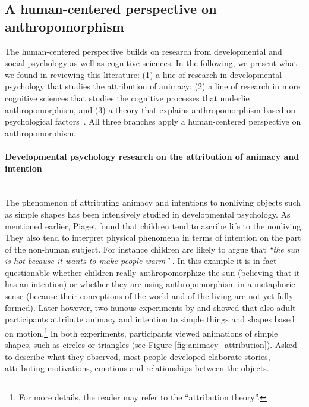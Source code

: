\documentclass{frontiersSCNS} %
\begin{document}
%
%
%
%
%
%

\subsection{A human-centered perspective on anthropomorphism}

The human-centered perspective builds on research from developmental and social psychology as well as cognitive sciences.  In the following, we present what we found in reviewing this literature: (1) a line of research in developmental psychology that studies the attribution of animacy; (2) a line of research in more cognitive sciences that studies the cognitive processes that underlie anthropomorphism, and (3) a theory that explains anthropomorphism based on psychological factors~\citep{epley_seeing_2007}. All three branches apply a human-centered perspective on anthropomorphism.


\paragraph*{Developmental psychology research on the attribution of animacy and intention\\ \\}

The phenomenon of attributing animacy and intentions to nonliving objects such as simple shapes has been intensively studied in developmental psychology. As mentioned earlier, Piaget found that children tend to ascribe life to the nonliving. They also tend to interpret physical phenomena in terms of intention on the part of the non-human subject. For instance children are likely to argue that \textit{``the sun is hot because it wants to make people warm''} \citep{leeds_childrens_1992}. In this example it is in fact questionable whether children really anthropomorphize the sun (believing that it has an intention) or whether they are using anthropomorphism in a metaphoric sense (because their conceptions of the world and of the living are not yet fully formed). Later however, two famous experiments by \cite{heider_experimental_1944} and \cite{michotte_perception_1963} showed that also adult participants attribute animacy and intention to simple things and shapes based on motion.\footnote{For more details, the reader may refer to the ``attribution theory''.} In both experiments, participants viewed animations of simple shapes, such as circles or triangles (see Figure \ref{fig:animacy_attribution}). Asked to describe what they observed, most people developed elaborate stories, attributing motivations, emotions and relationships between the objects.
\end{document}
